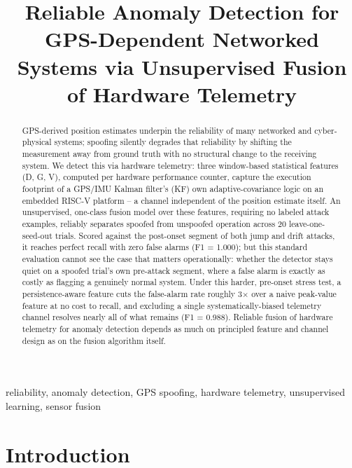 \documentclass[conference]{IEEEtran}
\newcommand{\todo}[1]{\textcolor{red}{\itshape [TODO: #1]}}
\begin{document}
\title{Reliable Anomaly Detection for GPS-Dependent Networked Systems via Unsupervised Fusion of Hardware Telemetry}

\author{
\IEEEauthorblockN{\todo{Author names}}
\IEEEauthorblockA{\todo{Affiliation}}
}

\maketitle

\begin{abstract}
GPS-derived position estimates underpin the reliability of many networked and cyber-physical systems; spoofing silently degrades that reliability by shifting the measurement away from ground truth with no structural change to the receiving system. We detect this via hardware telemetry: three window-based statistical features (D, G, V), computed per hardware performance counter, capture the execution footprint of a GPS/IMU Kalman filter's (KF) own adaptive-covariance logic on an embedded RISC-V platform -- a channel independent of the position estimate itself. An unsupervised, one-class fusion model over these features, requiring no labeled attack examples, reliably separates spoofed from unspoofed operation across 20 leave-one-seed-out trials. Scored against the post-onset segment of both jump and drift attacks, it reaches perfect recall with zero false alarms (F1 = 1.000); but this standard evaluation cannot see the case that matters operationally: whether the detector stays quiet on a spoofed trial's own pre-attack segment, where a false alarm is exactly as costly as flagging a genuinely normal system. Under this harder, pre-onset stress test, a persistence-aware feature cuts the false-alarm rate roughly 3$\times$ over a naive peak-value feature at no cost to recall, and excluding a single systematically-biased telemetry channel resolves nearly all of what remains (F1 = 0.988). Reliable fusion of hardware telemetry for anomaly detection depends as much on principled feature and channel design as on the fusion algorithm itself.
\end{abstract}

\begin{IEEEkeywords}
reliability, anomaly detection, GPS spoofing, hardware telemetry, unsupervised learning, sensor fusion
\end{IEEEkeywords}

\section{Introduction}
\label{sec:intro}
\end{document}
